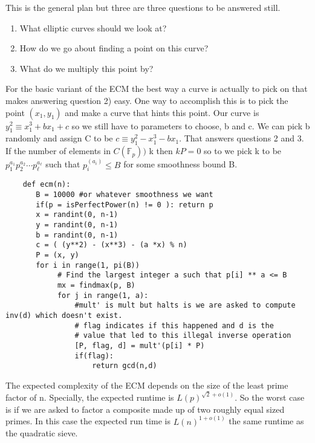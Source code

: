 \documentclass{article}
\begin{document}
This is the general plan but three are three questions to be answered still.
\begin{enumerate}
    \item What elliptic curves should we look at?
    \item How do we go about finding a point on this curve?
    \item What do we multiply this point by?
\end{enumerate}
For the basic variant of the ECM the best way a curve is actually to pick on that makes answering question 2) easy. One way to accomplish this is to pick the point $(x_1, y_1)$ and make a curve that hints this point. Our curve is $y_1^2 \equiv x_1^3 + bx_1 + c$ so we still have to parameters to choose, b and c. We can pick b randomly and assign C to be $c \equiv y_1^2 -x_1^3 - bx_1$. That answers questions 2 and 3. If the number of elements in $C(\mathbb{F}_p))$ k then $kP = 0$ so to we pick k to be $p_1^{a_1} p_2^{a_2} \cdots p_\ell^{a_\ell}$ such that $p_i^(a_i) \leq B$ for some smoothness bound B. 
\begin{verbatim}
    def ecm(n):
       B = 10000 #or whatever smoothness we want
       if(p = isPerfectPower(n) != 0 ): return p
       x = randint(0, n-1)
       y = randint(0, n-1)
       b = randint(0, n-1)
       c = ( (y**2) - (x**3) - (a *x) % n)
       P = (x, y)
       for i in range(1, pi(B))
            # Find the largest integer a such that p[i] ** a <= B
            mx = findmax(p, B)
            for j in range(1, a):
                #mult' is mult but halts is we are asked to compute inv(d) which doesn't exist. 
                # flag indicates if this happened and d is the 
                # value that led to this illegal inverse operation
                [P, flag, d] = mult'(p[i] * P) 
                if(flag):
                    return gcd(n,d)
\end{verbatim}

The expected complexity of the ECM depends on the size of the least prime factor of n. Specially, the expected runtime is $L(p)^{\sqrt{2} + o(1)}$. So the worst case is if we are asked to factor a composite made up of two roughly equal sized primes. In this case the expected run time is $L(n)^{1 + o(1)}$ the same runtime as the quadratic sieve. 
\end{document}
